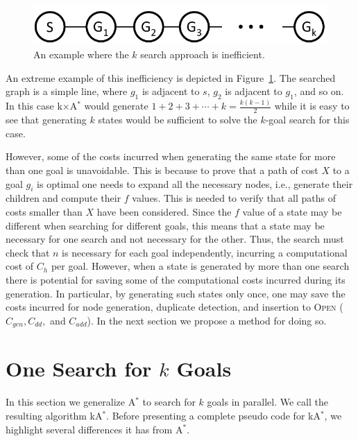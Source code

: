 \documentclass{aicom2e}
\newcommand{\kgs}{$k$-goal search}
\newcommand{\astar}{A$^*$}
\newcommand{\kastar}{kA$^*$}
\newcommand{\kxastar}{k$\times$A$^*$}
\newcommand{\open}{\textsc{Open}}
\begin{document}
\begin{figure}
	\includegraphics[width=\columnwidth]{k-search-bad_cropped}
	\caption{An example where the $k$ search approach is inefficient.}
	\label{fig:k-search-bad}
\end{figure}
An extreme example of this inefficiency is depicted in Figure~\ref{fig:k-search-bad}. The searched graph is a simple line, 
where $g_1$ is adjacent to $s$, $g_2$ is adjacent to $g_1$, and so on. In this case \kxastar{} would generate
$1+2+3+\cdots+k=\frac{k(k-1)}{2}$ while it is easy to see that generating $k$ states would be sufficient to solve the \kgs{} for this case. 


However, some of the costs incurred when generating the same state for more than one goal is unavoidable. 
This is because to prove that a path of cost $X$ to a goal $g_i$ is optimal one needs to expand all the necessary nodes, 
i.e., generate their children and compute their $f$ values. This is needed to verify that all paths of costs smaller than $X$ have been considered. Since the $f$ value of a state may be different when searching for different goals, this means that a state may be necessary for one search and not necessary for the other. 
Thus, the search must check that $n$ is necessary for each goal independently, incurring a computational cost of $C_{h}$ per goal. 
However, when a state is generated by more than one search there is potential for saving some of the computational costs incurred during its generation. In particular, by generating such states only once, one may save the costs incurred for node generation, duplicate detection, and insertion to \open{} ($C_{gen}, C_{dd},$ and $C_{add}$). In the next section we propose a method for doing so. 



\section{One Search for $k$ Goals}
\label{sec:one-k-goal-search}
In this section we generalize \astar{} to search for $k$ goals in parallel. 
We call the resulting algorithm \kastar{}. 
Before presenting a complete pseudo code for \kastar{}, we highlight several differences it has from \astar{}. 
\end{document}
